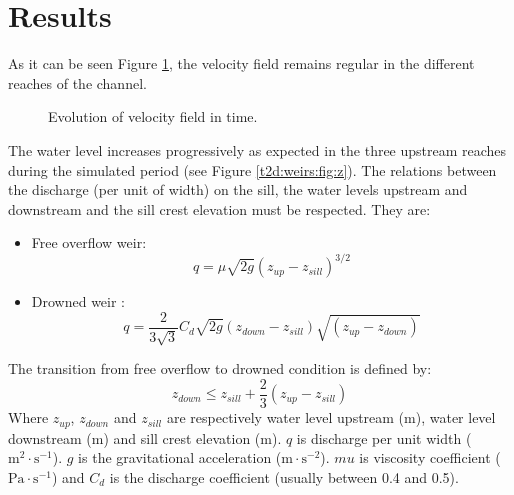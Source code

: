 \section{Results}

As it can be seen Figure \ref{t2d:weirs:velocity},
the velocity field remains regular in the different reaches of the channel.

\begin{figure}[!htbp]
\begin{minipage}[t]{0.50\textwidth}
 \centering
\end{minipage}%
\begin{minipage}[t]{0.50\textwidth}
 \centering
\end{minipage}
\begin{minipage}[t]{0.50\textwidth}
 \centering
\end{minipage}%
\begin{minipage}[t]{0.50\textwidth}
 \centering
\end{minipage}
 \caption{Evolution of velocity field in time.}
 \label{t2d:weirs:velocity}
\end{figure}

The water level increases progressively as expected
in the three upstream reaches during the simulated period
(see Figure \ref{t2d:weirs:fig:z}). The relations between
the discharge (per unit of width) on the sill, the water levels
upstream and downstream and the sill crest elevation must be respected.
They are:
\begin{itemize}
\item Free overflow weir:
\begin{equation*}
q=\mu \sqrt{2g}\left( z_{up}-z_{sill} \right)^{3/2}
\end{equation*}
\item Drowned weir :
 	\begin{equation*}
q=\frac{2}{3\sqrt{3}}C_{d} \sqrt{2g}\left( z_{down}-z_{sill} \right)\sqrt{\left( z_{up}-z_{down} \right)}
\end{equation*}
\end{itemize}
The transition from free overflow to drowned condition is defined by:
\begin{equation}
  	z_{down} \leq z_{sill}+ \frac{2}{3}\left( z_{up}-z_{sill} \right)
  	\label{t2d:weirs:eq:1}
\end{equation}
Where $z_{up}$, $z_{down}$ and $z_{sill}$ are respectively
water level upstream (m), water level downstream (m) and
sill crest elevation (m).  $q$ is discharge per unit width
($\text{m}^2\cdot\text{s}^{-1}$). $g$ is the gravitational acceleration ($\text{m}\cdot\text{s}^{-2}$). $mu$ is viscosity coefficient ( $\text{Pa}\cdot\text{s}^{-1}$) and $C_{d}$ is the discharge coefficient
(usually between 0.4 and 0.5).


